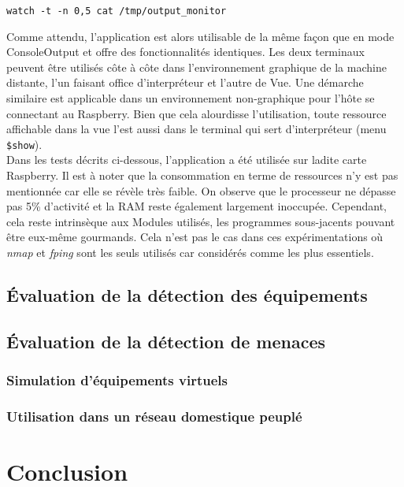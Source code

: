\documentclass[]{article}
\begin{document}
\indent \texttt{watch -t -n 0,5 cat /tmp/output\_monitor}
\vspace{0.4cm}

Comme attendu, l'application est alors utilisable de la même façon que en mode ConsoleOutput et offre des fonctionnalités identiques. Les deux terminaux peuvent être utilisés côte à côte dans l'environnement graphique de la machine distante, l'un faisant office d'interpréteur et l'autre de Vue. Une démarche similaire est applicable dans un environnement non-graphique pour l'hôte se connectant au Raspberry. Bien que cela alourdisse l'utilisation, toute ressource affichable dans la vue l'est aussi dans le terminal qui sert d'interpréteur (menu \texttt{\$show}).\\

Dans les tests décrits ci-dessous, l'application a été utilisée sur ladite carte Raspberry. Il est à noter que la consommation en terme de ressources n'y est pas mentionnée car elle se révèle très faible. On observe que le processeur ne dépasse pas 5\% d'activité et la RAM reste également largement inoccupée. Cependant, cela reste intrinsèque aux Modules utilisés, les programmes sous-jacents pouvant être eux-même gourmands. Cela n'est pas le cas dans ces expérimentations où \textit{nmap} et \textit{fping} sont les seuls utilisés car considérés comme les plus essentiels.


\subsection{Évaluation de la détection des équipements}

\subsection{Évaluation de la détection de menaces}

\subsubsection{Simulation d'équipements virtuels}

\subsubsection{Utilisation dans un réseau domestique peuplé}

\newpage

\section{Conclusion}
\end{document}
